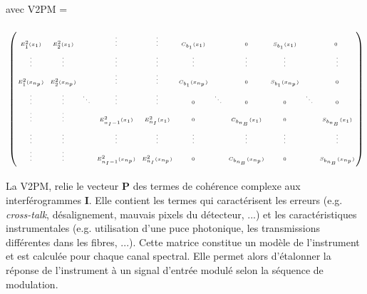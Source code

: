 avec V2PM =
\begin{align}\tiny
    \hspace{-1ex}\bordermatrix{
        & \tikzmark{harrowleft1} & & & & \tikzmark{harrowright1} & \tikzmark{harrowleft2} & & \tikzmark{harrowright2} & \tikzmark{harrowleft3} & & \tikzmark{harrowright3} \cr
        & E_{1}^2(x_1)     & E_{2}^2(x_1)     &        & \vdots               & \vdots             & C_{b_1}(x_1)     &        & 0                    & S_{b_1}(x_1)     &        & \hphantom{mmi} 0 \hphantom{mmii} \tikzmark{varrowtop} \cr
        & \vdots           & \vdots           &        & \vdots               & \vdots             & \vdots           &        & \vdots               & \vdots           &        & \vdots \cr
        & E_{1}^2(x_{n_p}) & E_{2}^2(x_{n_p}) &        & \vdots               & \vdots             & C_{b_1}(x_{n_p}) &        & 0                    & S_{b_1}(x_{n_p}) &        & 0 \cr
        & \vdots           & \vdots           & \ddots & \vdots               & \vdots             & 0                & \ddots & 0                    & 0                & \ddots & 0 \cr
        & \vdots           & \vdots           &        & E_{n_I-1}^2(x_1)     & E_{n_I}^2(x_1)     & 0                &        & C_{b_{n_B}}(x_1)     & 0                &        & S_{b_{n_B}}(x_1) \cr
        & \vdots           & \vdots           &        & \vdots               & \vdots             & \vdots           &        & \vdots               & \vdots           &        & \vdots \cr
        & \vdots           & \vdots           &        & E_{n_I-1}^2(x_{n_p}) & E_{n_I}^2(x_{n_p}) & 0                &        & C_{b_{n_B}}(x_{n_p}) & 0                &        & S_{b_{n_B}}(x_{n_p}) \tikzmark{varrowbottom} \cr
        }
\end{align}

La \acrfull{V2PM}, relie le vecteur $\textbf{P}$ des termes de cohérence complexe aux interférogrammes $\textbf{I}$. Elle contient les termes qui caractérisent les erreurs (e.g. \textit{cross-talk}, désalignement, mauvais pixels du détecteur, ...) et les caractéristiques instrumentales (e.g. utilisation d'une puce photonique, les transmissions différentes dans les fibres, ...). Cette matrice constitue un modèle de l'instrument et est calculée pour chaque canal spectral. Elle permet alors d'étalonner la réponse de l'instrument à un signal d'entrée modulé selon la séquence de modulation.

